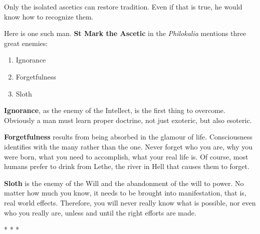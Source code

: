 Only the isolated ascetics can restore tradition. Even if that is true, he would know how to recognize them.

Here is one such man. \textbf{St Mark the Ascetic} in the
\emph{Philokalia} mentions three great enemies:


\begin{enumerate}


\item Ignorance

\item Forgetfulness

\item Sloth
\end{enumerate}


\textbf{Ignorance}, as the enemy of the Intellect, is the first thing to overcome. Obviously a man must learn proper doctrine, not just exoteric, but also esoteric.

\textbf{Forgetfulness} results from being absorbed in the glamour of life. Consciousness identifies with the many rather than the one. Never forget who you are, why you were born, what you need to accomplish, what your real life is. Of course, most humans prefer to drink from Lethe, the river in Hell that causes them to forget.

\textbf{Sloth} is the enemy of the Will and the abandonment of the will to power. No matter how much you know, it needs to be brought into manifestation, that is, real world effects. Therefore, you will never really know what is possible, nor even who you really are, unless and until the right efforts are made.



\begin{center}* * *\end{center}

